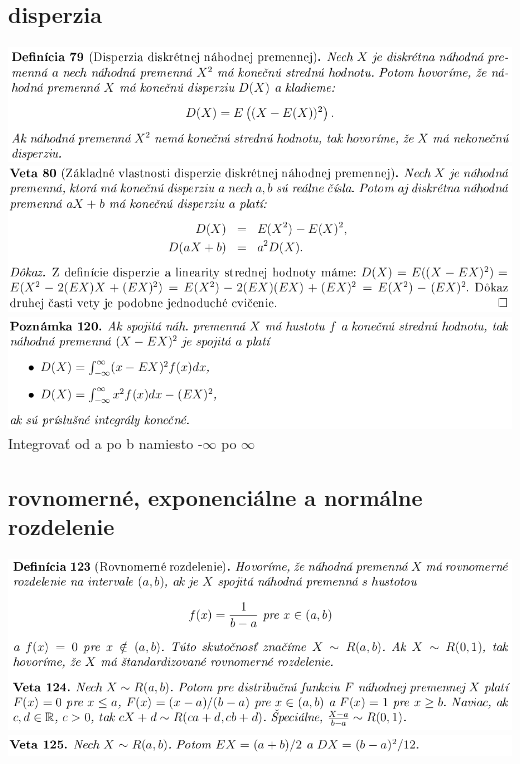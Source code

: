 \subsection {disperzia}
\includegraphics[width=1\textwidth]{images/disp}\\
\includegraphics[width=1\textwidth]{images/vlast_disp}\\
\includegraphics[width=1\textwidth]{images/pozn_disp_spoj}\\
Integrovať od a po b namiesto -$\infty$ po $\infty$\\
\subsection {rovnomerné, exponenciálne a normálne rozdelenie}
\includegraphics[width=1\textwidth]{images/rovn_rozd}\\
\includegraphics[width=1\textwidth]{images/rovn_rozd_II}

